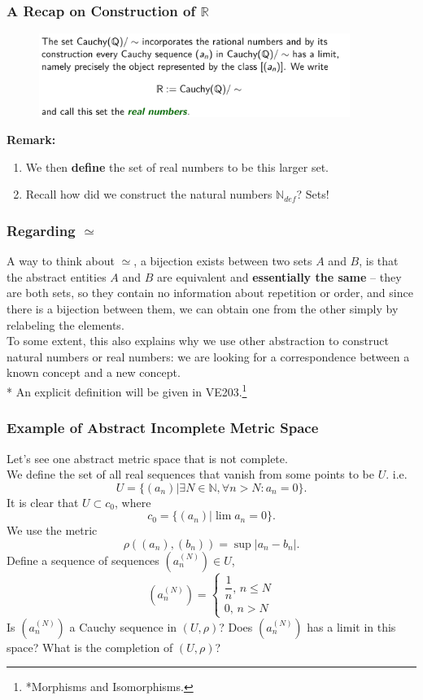 \documentclass[10pt, t]{beamer}
\newcommand{\N}{\mathbb{N}}
\newcommand{\R}{\mathbb{R}}
\newcommand{\nullspace}{~\\[15pt]}
\begin{document}
\begin{frame}
    \frametitle{A Recap on Construction of $\R$}
\begin{figure}[H]
        \centering
        \includegraphics[width=0.9\textwidth]{2020-10-13-21-23-38.png}
    \end{figure}
    \textbf{Remark:} 
    \begin{enumerate}
        \item We then \textbf{define} the set of real numbers to be this larger set. 
        \item Recall how did we construct the natural numbers $\N_{def}$? Sets!
    \end{enumerate}
\end{frame}

\begin{frame}
    \frametitle{Regarding $\simeq$}

    A way to think about $\simeq$, a bijection exists between two sets $A$ and $B$, is that the abstract entities  $A$ and $B$ are equivalent and \textbf{essentially the same} -- they are both sets, so they contain no information about repetition or order, and since there is a bijection between them, we can obtain one from the other simply by relabeling the elements.
    \nullspace
    To some extent, this also explains why we use other abstraction to construct natural numbers or real numbers: we are looking for a correspondence between a known concept and a new concept.
    \nullspace
    * An explicit definition will be given in VE203.\footnote[frame]{*Morphisms and Isomorphisms.}

\end{frame}

\begin{frame}
    \frametitle{Example of Abstract Incomplete Metric Space}
    Let's see one abstract metric space that is not complete.\\[8pt] We define the set of all real sequences that vanish from some points to be $U$. i.e.
    $$U=\{(a_n)|\exists N\in\N,\forall n>N:a_n=0\}.$$
    It is clear that $U\subset c_0$, where $$c_0=\{(a_n)|\lim a_n = 0\}.$$
    We use the metric $$\rho((a_n),(b_n))=\sup|a_n-b_n|.$$
    Define a sequence of sequences $(a_n^{(N)})\in U$, $$(a_n^{(N)})=\left\{\begin{matrix}
        \dfrac{1}{n},\, n\leq N\\[8pt]
        0,\, n>N
        \end{matrix}\right.$$
    Is $(a_n^{(N)})$ a Cauchy sequence in $(U,\rho)$? Does $(a_n^{(N)})$ has a limit in this space? What is the completion of $(U,\rho)$?

\end{frame}
\end{document}
